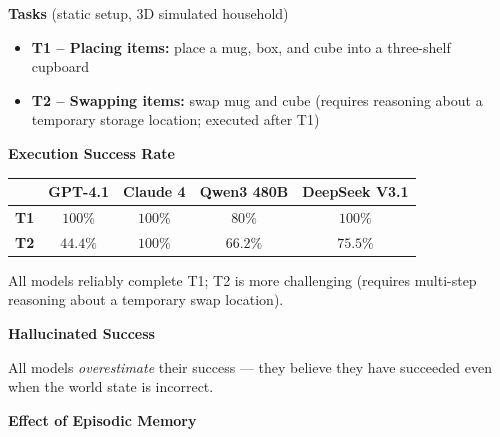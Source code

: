 \documentclass[../hbrs-poster.tex]{subfiles}
\begin{document}
    {
        \noindent\begin{minipage}[c]{25cm}
            \vspace{0.4cm}
            \textbf{Tasks} (static setup, 3D simulated household)

            \begin{itemize}
                \item \textbf{T1 -- Placing items:} place a mug, box, and cube into a three-shelf cupboard
                \item \textbf{T2 -- Swapping items:} swap mug and cube (requires reasoning about a temporary storage location; executed after T1)
            \end{itemize}

            \vspace{0.8em}
            \textbf{Execution Success Rate}

            \vspace{0.4em}
            \begin{center}
                \begin{tabular}{l | c | c | c | c}
                    & \textbf{GPT-4.1} & \textbf{Claude 4} & \textbf{Qwen3 480B} & \textbf{DeepSeek V3.1} \\\hline
                    \textbf{T1} & $100\%$ & $100\%$ & $80\%$  & $100\%$ \\
                    \textbf{T2} & $44.4\%$ & $100\%$ & $66.2\%$ & $75.5\%$
                \end{tabular}
            \end{center}

            \vspace{0.8em}
            All models reliably complete T1; T2 is more challenging (requires multi-step reasoning about a temporary swap location).

            \vspace{0.8em}
            \textbf{Hallucinated Success}
            \vspace{0.4em}
            
            All models \emph{overestimate} their success --- they believe they have succeeded even when the world state is incorrect.

            \vspace{0.8em}
            \textbf{Effect of Episodic Memory}


\end{minipage}}
\end{document}
